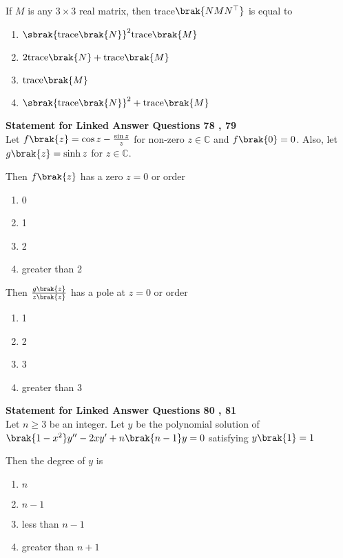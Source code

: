     \item[77.] If $M$ is any $3 \times 3$ real matrix, then trace$\brak{NMN^{\top}}$ is equal to
		\hfill{}
\begin{enumerate}
    \item $\sbrak{\textnormal{trace}\brak{N}}^2 \textnormal{trace}\brak{M}$ 
    \item $2\textnormal{trace}\brak{N} + \textnormal{trace}\brak{M}$
    \item $\textnormal{trace}\brak{M}$
    \item $\sbrak{\textnormal{trace}\brak{N}}^2 + \textnormal{trace}\brak{M}$ 
		\end{enumerate}
\textbf{Statement for Linked Answer Questions 78 , 79}\\
Let $f\brak{z} = \cos z - \frac{\sin z}{z}$ for non-zero $z \in \mathbb{C}$ and $f\brak{0} = 0$.
Also, let $g\brak{z} = \sinh z$ for $z \in \mathbb{C}$.
    \item[78.] Then $f\brak{z}$ has a zero $z = 0$ or order 
		\hfill{}
        \begin{enumerate}
    \item 0 
    \item 1
    \item 2
    \item greater than 2
        \end{enumerate}
\item[79.] Then $\frac{g\brak{z}}{z\brak{z}}$ has a pole at $z = 0$ or order 
		\hfill{}
        \begin{enumerate}
    \item 1
    \item 2
    \item 3 
    \item greater than 3
        \end{enumerate}
\textbf{Statement for Linked Answer Questions 80 , 81}\\
Let $n \ge 3$ be an integer. Let $y$ be the polynomial solution of $\brak{1-x^2}y^{\prime \prime}
-2xy^{\prime} + n\brak{n-1}y = 0$ satisfying $y\brak{1} = 1$
	\item[80.] Then the degree of $y$ is
		\hfill{}
        \begin{multicols}{4}
		\begin{enumerate}
			\item $n$ 
			\columnbreak
			\item $n -1$
			\columnbreak
			\item less than $n-1$
			\columnbreak
			\item greater than $n + 1$
		\end{enumerate}
	\end{multicols}
